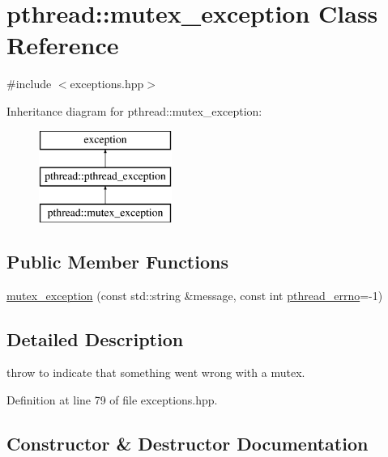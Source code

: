 \hypertarget{classpthread_1_1mutex__exception}{}\section{pthread\+:\+:mutex\+\_\+exception Class Reference}
\label{classpthread_1_1mutex__exception}


{\ttfamily \#include $<$exceptions.\+hpp$>$}

Inheritance diagram for pthread\+:\+:mutex\+\_\+exception\+:\begin{figure}[H]
\begin{center}
\leavevmode
\includegraphics[height=3.000000cm]{classpthread_1_1mutex__exception}
\end{center}
\end{figure}
\subsection*{Public Member Functions}
\begin{DoxyCompactItemize}
\item 
\hyperlink{classpthread_1_1mutex__exception_a257c627226859a3f8937a29974b2c915}{mutex\+\_\+exception} (const std\+::string \&message, const int \hyperlink{classpthread_1_1pthread__exception_a4a869173054faca1945ac1a7729082d6}{pthread\+\_\+errno}=-\/1)
\end{DoxyCompactItemize}


\subsection{Detailed Description}
throw to indicate that something went wrong with a mutex. 

Definition at line 79 of file exceptions.\+hpp.



\subsection{Constructor \& Destructor Documentation}
